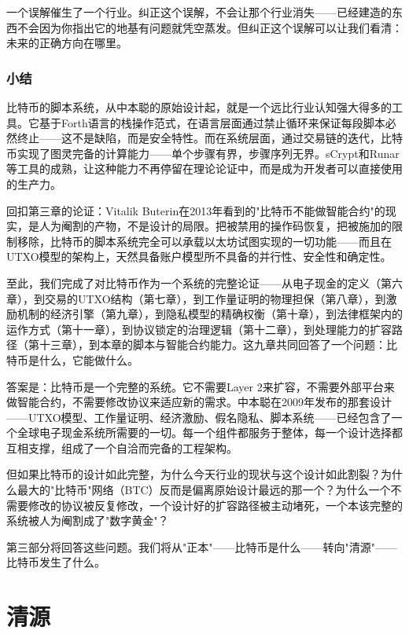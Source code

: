 \documentclass[a4paper,12pt,openany]{ctexbook}
\begin{document}
一个误解催生了一个行业。纠正这个误解，不会让那个行业消失——已经建造的东西不会因为你指出它的地基有问题就凭空蒸发。但纠正这个误解可以让我们看清：未来的正确方向在哪里。


\section*{小结}


比特币的脚本系统，从中本聪的原始设计起，就是一个远比行业认知强大得多的工具。它基于Forth语言的栈操作范式，在语言层面通过禁止循环来保证每段脚本必然终止——这不是缺陷，而是安全特性。而在系统层面，通过交易链的迭代，比特币实现了图灵完备的计算能力——单个步骤有界，步骤序列无界。sCrypt和Runar等工具的成熟，让这种能力不再停留在理论论证中，而是成为开发者可以直接使用的生产力。

回扣第三章的论证：Vitalik Buterin在2013年看到的"比特币不能做智能合约"的现实，是人为阉割的产物，不是设计的局限。把被禁用的操作码恢复，把被施加的限制移除，比特币的脚本系统完全可以承载以太坊试图实现的一切功能——而且在UTXO模型的架构上，天然具备账户模型所不具备的并行性、安全性和确定性。

至此，我们完成了对比特币作为一个系统的完整论证——从电子现金的定义（第六章），到交易的UTXO结构（第七章），到工作量证明的物理担保（第八章），到激励机制的经济引擎（第九章），到隐私模型的精确权衡（第十章），到法律框架内的运作方式（第十一章），到协议锁定的治理逻辑（第十二章），到处理能力的扩容路径（第十三章），到本章的脚本与智能合约能力。这九章共同回答了一个问题：比特币是什么，它能做什么。

答案是：比特币是一个完整的系统。它不需要Layer 2来扩容，不需要外部平台来做智能合约，不需要修改协议来适应新的需求。中本聪在2009年发布的那套设计——UTXO模型、工作量证明、经济激励、假名隐私、脚本系统——已经包含了一个全球电子现金系统所需要的一切。每一个组件都服务于整体，每一个设计选择都互相支撑，组成了一个自洽而完备的工程架构。

但如果比特币的设计如此完整，为什么今天行业的现状与这个设计如此割裂？为什么最大的"比特币"网络（BTC）反而是偏离原始设计最远的那一个？为什么一个不需要修改的协议被反复修改，一个设计好的扩容路径被主动堵死，一个本该完整的系统被人为阉割成了"数字黄金"？

第三部分将回答这些问题。我们将从"正本"——比特币是什么——转向"清源"——比特币发生了什么。




\part{清源}
\end{document}
